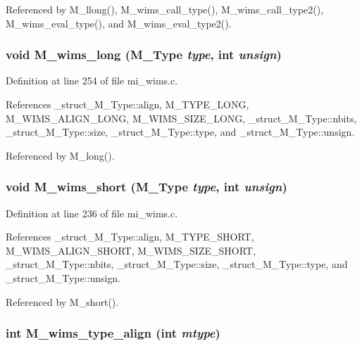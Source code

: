 Referenced by M\_\-llong(), M\_\-wims\_\-call\_\-type(), M\_\-wims\_\-call\_\-type2(), M\_\-wims\_\-eval\_\-type(), and M\_\-wims\_\-eval\_\-type2().
\subsubsection{\setlength{\rightskip}{0pt plus 5cm}void M\_\-wims\_\-long (\bf{M\_\-Type} {\em type}, int {\em unsign})}\label{mi__wims_8c_10a10f2e5c558f833813506fa43d5cbc}




Definition at line 254 of file mi\_\-wims.c.

References \_\-struct\_\-M\_\-Type::align, M\_\-TYPE\_\-LONG, M\_\-WIMS\_\-ALIGN\_\-LONG, M\_\-WIMS\_\-SIZE\_\-LONG, \_\-struct\_\-M\_\-Type::nbits, \_\-struct\_\-M\_\-Type::size, \_\-struct\_\-M\_\-Type::type, and \_\-struct\_\-M\_\-Type::unsign.

Referenced by M\_\-long().
\subsubsection{\setlength{\rightskip}{0pt plus 5cm}void M\_\-wims\_\-short (\bf{M\_\-Type} {\em type}, int {\em unsign})}\label{mi__wims_8c_030412cf6bb0185462a723ec21b989ed}




Definition at line 236 of file mi\_\-wims.c.

References \_\-struct\_\-M\_\-Type::align, M\_\-TYPE\_\-SHORT, M\_\-WIMS\_\-ALIGN\_\-SHORT, M\_\-WIMS\_\-SIZE\_\-SHORT, \_\-struct\_\-M\_\-Type::nbits, \_\-struct\_\-M\_\-Type::size, \_\-struct\_\-M\_\-Type::type, and \_\-struct\_\-M\_\-Type::unsign.

Referenced by M\_\-short().
\subsubsection{\setlength{\rightskip}{0pt plus 5cm}int M\_\-wims\_\-type\_\-align (int {\em mtype})}\label{mi__wims_8c_dd980bb7a24bc13fd60733caf4d9ac74}




